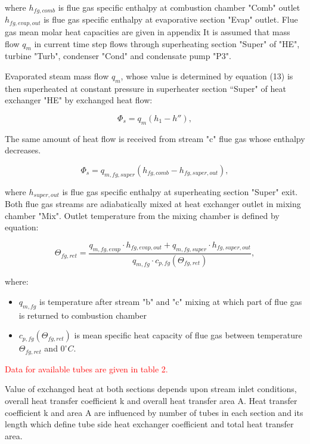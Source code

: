 \documentclass{article}
\begin{document}
	\noindent
	where 
	$h_{fg,comb}$ is flue gas specific enthalpy at combustion chamber "Comb" outlet
	$h_{fg,evap,out}$ is flue gas specific enthalpy at evaporative section "Evap" outlet.
	Flue gas mean molar heat capacities are given in appendix
	It is assumed that mass flow $q_m$ in current time step flows through superheating section "Super" of "HE", turbine "Turb", condenser "Cond" and condensate pump "P3".
	
	Evaporated steam mass flow $q_m$, whose value is determined by equation (13) is then superheated at constant pressure in superheater section “Super" of heat exchanger "HE" by exchanged heat flow:
	
	\begin{equation}\label{eq:evap_steam_mass3}
		\Phi_s = q_m(h_1 - h''),
	\end{equation}
	
	The same amount of heat flow is received from stream "c" flue gas whose enthalpy decreases.
	
	\begin{equation}\label{eq:evap_steam_mass4}
		\Phi_s = q_{m,fg,super} (h_{fg,comb} - h_{fg,super,out}),
	\end{equation}
	
	\noindent
	where $h_{super,out}$ is flue gas specific enthalpy at superheating section "Super" exit. Both flue gas streams are adiabatically mixed at heat exchanger outlet in mixing chamber "Mix". Outlet temperature from the mixing chamber is defined by equation:
	
	\begin{equation}\label{eq:outlet_temp}
		\Theta_{fg,ret} = \frac{q_{m,fg,evap} \cdot h_{fg,evap,out} + q_{m,fg,super} \cdot h_{fg,super,out}}{q_{m,fg} \cdot c_{p,fg} (\Theta_{fg,ret})},
	\end{equation}
	
	\noindent
	where:
	
	\begin{itemize}
		\item $q_{m,fg}$ is temperature after stream "b" and "c" mixing at which part of flue gas is returned to combustion chamber
		\item $c_{p,fg} (\Theta_{fg,ret})$ is mean specific heat capacity of flue gas between temperature $\Theta_{fg,ret}$ and $0^{\circ}C$.
	\end{itemize}
	
	\noindent
	\textcolor{red}{Data for available tubes are given in table 2.}
	
	\noindent
	Value of exchanged heat at both sections depends upon stream inlet conditions, overall heat transfer coefficient k and overall heat transfer area A. Heat transfer coefficient k and area A are influenced by number of tubes in each section and its length which define tube side heat exchanger coefficient and total heat transfer area.
	
\end{document}
